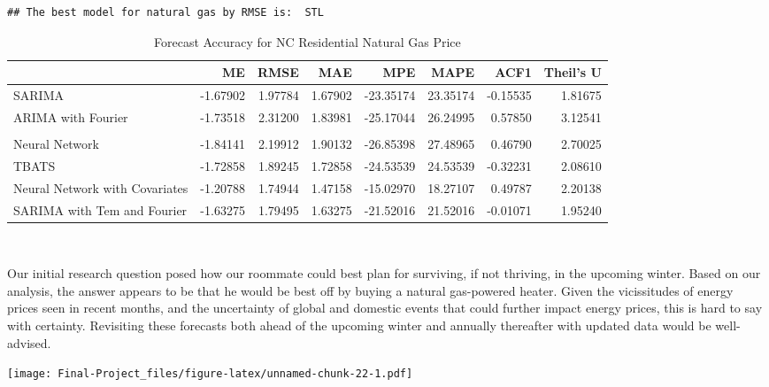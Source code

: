 \documentclass[
]{article}
\begin{document}
\begin{verbatim}
## The best model for natural gas by RMSE is:  STL
\end{verbatim}

\begin{table}[!h]

\caption{\label{tab:compare performace scores and generate tables for use}Forecast Accuracy for NC Residential Natural Gas Price}
\centering
\begin{tabular}[t]{l|r|r|r|r|r|r|r}
\hline
  & ME & RMSE & MAE & MPE & MAPE & ACF1 & Theil's U\\
\hline
SARIMA & -1.67902 & 1.97784 & 1.67902 & -23.35174 & 23.35174 & -0.15535 & 1.81675\\
\hline
ARIMA with Fourier & -1.73518 & 2.31200 & 1.83981 & -25.17044 & 26.24995 & 0.57850 & 3.12541\\
\hline
\cellcolor{red}{STL} & \cellcolor{red}{-1.04788} & \cellcolor{red}{1.35599} & \cellcolor{red}{1.11314} & \cellcolor{red}{-14.03428} & \cellcolor{red}{14.80904} & \cellcolor{red}{-0.33348} & \cellcolor{red}{1.28849}\\
\hline
Neural Network & -1.84141 & 2.19912 & 1.90132 & -26.85398 & 27.48965 & 0.46790 & 2.70025\\
\hline
TBATS & -1.72858 & 1.89245 & 1.72858 & -24.53539 & 24.53539 & -0.32231 & 2.08610\\
\hline
Neural Network with Covariates & -1.20788 & 1.74944 & 1.47158 & -15.02970 & 18.27107 & 0.49787 & 2.20138\\
\hline
SARIMA with Tem and Fourier & -1.63275 & 1.79495 & 1.63275 & -21.52016 & 21.52016 & -0.01071 & 1.95240\\
\hline
\end{tabular}
\end{table}

~ ~

Our initial research question posed how our roommate could best plan for
surviving, if not thriving, in the upcoming winter. Based on our
analysis, the answer appears to be that he would be best off by buying a
natural gas-powered heater. Given the vicissitudes of energy prices seen
in recent months, and the uncertainty of global and domestic events that
could further impact energy prices, this is hard to say with certainty.
Revisiting these forecasts both ahead of the upcoming winter and
annually thereafter with updated data would be well-advised.

\texttt{[image: Final-Project\_files/figure-latex/unnamed-chunk-22-1.pdf]}
\end{document}

